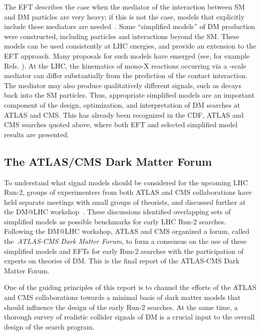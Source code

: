 The EFT describes the case when the mediator of the interaction between SM and DM particles are very heavy; 
if this is not the case, models that explicitly include these mediators are 
needed~\cite{Goodman:2010yf,Shoemaker:2011vi,Bai:2010hh,Kopp:2011eu,Fox:2011fx,Fox:2011pm,Shoemaker:2011vi,Busoni:2013lha}.
Some ``simplified models'' \cite{Alwall:2008ag,Goodman:2011jq,Alves:2011wf}
of DM production were constructed, including particles and interactions beyond the SM.
These models can be used consistently at LHC energies, and provide
an extension to the EFT approach. 
Many proposals for such models have emerged (see, for example
Refs. \cite{An:2012va,An:2012ue,Tait:2013,Buchmueller:2013dya,Bai:2013iqa,Bai:2014osa,An:2013xka,Yavin:14092893,Malik:2014ggr,Harris:2014hga,Buckley:2014fba,Haisch:2015ioa,Bai:2012xg,Carpenter:2012rg,Bell:2012rg,Petrov:2013nia,Carpenter:2013xra}). 
At the LHC, the kinematics of mono-X reactions occurring via a \tev-scale mediator can differ substantially from the prediction of the contact
interaction. The mediator may also produce qualitatively different signals, such as decays back into the SM particles. 
Thus, appropriate simplified models are an important component of the design, optimization, and interpretation of DM searches at ATLAS and CMS.
This has already been recognized in the CDF, ATLAS and CMS searches quoted above, where both EFT and selected simplified model
results are presented. 

\subsection{The ATLAS/CMS Dark Matter Forum}

To understand what signal models should be considered for the upcoming LHC Run-2, 
groups of experimenters from both ATLAS and CMS collaborations have held separate 
meetings with small groups of theorists, and discussed further at the DM@LHC 
workshop~\cite{Malik:2014ggr,Yavin:14092893,DMatLHCProceedings}. 
These discussions identified overlapping sets of simplified models as possible
benchmarks for early LHC Run-2 searches. 
Following the DM@LHC workshop, ATLAS and CMS organized a forum, called the~\textit{ATLAS-CMS Dark
Matter Forum}, to form a consensus on the use of these simplified models
and EFTs for early Run-2 searches with the participation of experts on
theories of DM. This is the final report of the ATLAS-CMS Dark Matter Forum.

One of the guiding principles of this report is to channel the efforts
of the ATLAS and CMS collaborations towards a minimal basis of dark
matter models that should influence the design of the early Run-2
searches. At the same time, a thorough survey of realistic collider
signals of DM is a crucial input to the overall design of the
search program.

